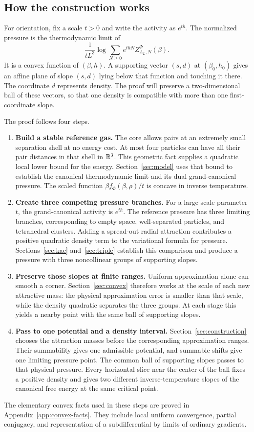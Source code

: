 \subsection{How the construction works}
For orientation, fix a scale $t>0$ and write the activity as $e^{th}$.
The normalized pressure is the thermodynamic limit of
\[
 \frac1{tL^3}\log\sum_{N\ge0}e^{thN}Z_{\Lambda_L,N}^\Phi(\beta).
\]
It is a convex function of $(\beta,h)$. A supporting vector $(s,d)$ at
$(\beta_0,h_0)$ gives an affine plane of slope $(s,d)$ lying below that
function and touching it there. The coordinate $d$ represents density.
The proof will preserve a two-dimensional ball of these vectors, so that
one density is compatible with more than one first-coordinate slope.

The proof follows four steps.
\begin{enumerate}[leftmargin=*]
\item \textbf{Build a stable reference gas.}
The core allows pairs at an extremely small separation shell at no energy
cost. At most four particles can have all their pair distances in that shell
in $\mathbb R^3$. This geometric fact supplies a quadratic local lower bound for the
energy. Section~\ref{sec:model} uses that bound to establish the canonical
thermodynamic limit and its dual grand-canonical pressure. The scaled
function $\beta f_\Phi(\beta,\rho)/t$ is concave in inverse temperature.
\item \textbf{Create three competing pressure branches.}
For a large scale parameter $t$, the grand-canonical activity is $e^{th}$.
The reference pressure has three limiting branches, corresponding to empty
space, well-separated particles, and tetrahedral clusters. Adding a spread-out radial attraction contributes a positive quadratic
density term to the variational formula for pressure. Sections~\ref{sec:kac}
and~\ref{sec:triple} establish this comparison and produce a pressure with
three noncollinear groups of supporting slopes.
\item \textbf{Preserve those slopes at finite ranges.}
Uniform approximation alone can smooth a corner. Section~\ref{sec:convex}
therefore works at the scale of each new attractive mass: the physical
approximation error is smaller than that scale, while the density quadratic
separates the three groups. At each stage this yields a nearby point with the
same ball of supporting slopes.
\item \textbf{Pass to one potential and a density interval.}
Section~\ref{sec:construction} chooses the attraction masses before the
corresponding approximation ranges. Their summability gives one admissible
potential, and summable shifts give one limiting pressure point. The common
ball of supporting slopes passes to that physical pressure. Every horizontal slice near the center of the ball fixes a positive
density and gives two different inverse-temperature slopes of the canonical
free energy at the same critical point.
\end{enumerate}

The elementary convex facts used in these steps are proved in
Appendix~\ref{app:convex-facts}. They include local uniform convergence,
partial conjugacy, and representation of a subdifferential by limits of
ordinary gradients.
